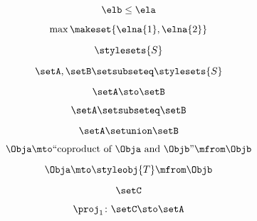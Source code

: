{\begin{forslides}
        \begin{equation}
            \label{eq:combination-142}
            \elb\leq \ela
        \end{equation}

        \begin{equation}
            \label{eq:combination-143}
            \max\makeset{\elna{1},\elna{2}}
        \end{equation}

        \begin{equation}
            \label{eq:combination-144}
            \stylesets{S}
        \end{equation}

        \begin{equation}
            \label{eq:combination-145}
            \setA,\setB\setsubseteq \stylesets{S}
        \end{equation}

        \begin{equation}
            \label{eq:combination-146}
            \setA \sto \setB
        \end{equation}

        \begin{equation}
            \label{eq:combination-147}
            \setA\setsubseteq \setB
        \end{equation}

        \begin{equation}
            \label{eq:combination-148}
            \setA\setunion\setB
        \end{equation}

        \begin{equation}
            \label{eq:combination-149}
            \Obja \mto \text{``coproduct of } \Obja \text{ and } \Objb \text{''}  \mfrom \Objb
        \end{equation}

        \begin{equation}
            \label{eq:combination-150}
            \Obja \mto \styleobj{T} \mfrom \Objb
        \end{equation}

        \begin{equation}
            \label{eq:combination-151}
            \setC
        \end{equation}

        \begin{equation}
            \label{eq:combination-152}
            \proj_1\colon \setC \sto \setA
        \end{equation}


\end{forslides}}
